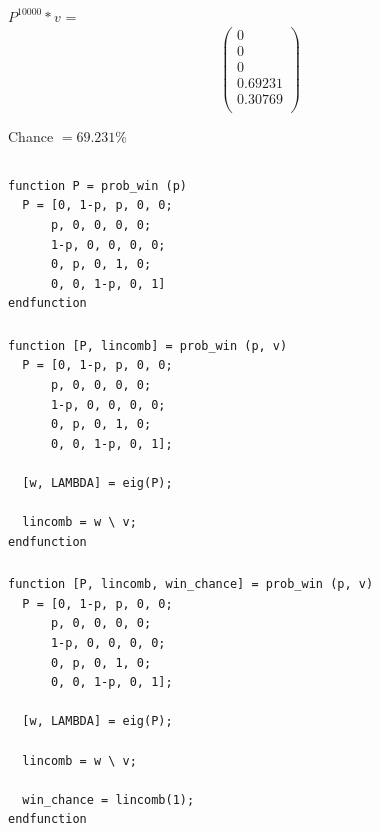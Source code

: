 \documentclass{article}
\begin{document}
\subsubsection{}
$P^{10000} * v$ = \[
  \begin{pmatrix}
    0 \\
    0 \\
    0 \\
    0.69231 \\
    0.30769 \\
    
  \end{pmatrix}
\]

Chance $= 69.231 \%$


\subsection{}
\subsubsection{}
\begin{lstlisting}
function P = prob_win (p)
  P = [0, 1-p, p, 0, 0;
      p, 0, 0, 0, 0;
      1-p, 0, 0, 0, 0;
      0, p, 0, 1, 0;
      0, 0, 1-p, 0, 1]
endfunction
\end{lstlisting}

\subsubsection{}
\begin{lstlisting}
function [P, lincomb] = prob_win (p, v)
  P = [0, 1-p, p, 0, 0;
      p, 0, 0, 0, 0;
      1-p, 0, 0, 0, 0;
      0, p, 0, 1, 0;
      0, 0, 1-p, 0, 1];
  
  [w, LAMBDA] = eig(P);
  
  lincomb = w \ v;
endfunction
\end{lstlisting}

\subsubsection{}
\begin{lstlisting}
function [P, lincomb, win_chance] = prob_win (p, v)
  P = [0, 1-p, p, 0, 0;
      p, 0, 0, 0, 0;
      1-p, 0, 0, 0, 0;
      0, p, 0, 1, 0;
      0, 0, 1-p, 0, 1];
  
  [w, LAMBDA] = eig(P);
  
  lincomb = w \ v;
  
  win_chance = lincomb(1);
endfunction
\end{lstlisting}
\end{document}

